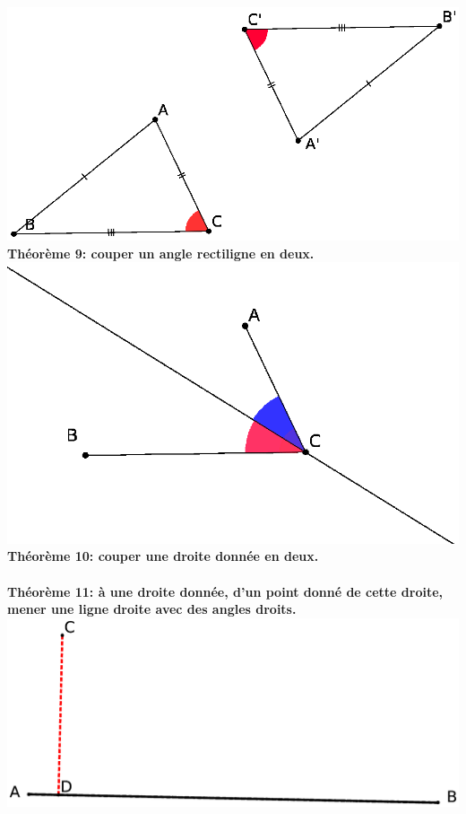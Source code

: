 \documentclass[a4paper, 12pt, twoside]{book}
\begin{document}
 \includegraphics[scale=0.7]{figures/euc.eps} \\
 
 \textbf{Théorème 9: couper un angle rectiligne en deux.}\\
 
 
 \includegraphics[scale=0.7]{figures/euc2.eps} \\
 
 
 \textbf{Théorème 10: couper une droite donnée en deux.}\\\\
 
 
 
 \textbf{Théorème 11: à une droite donnée, d'un point donné de cette droite, mener une ligne droite avec des angles droits.}\\
 
     
 \includegraphics[scale=0.2]{figures/th11.eps} \\
 
\end{document}
